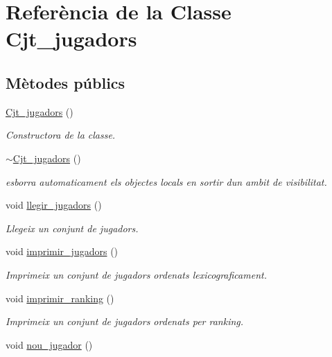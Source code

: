 \hypertarget{class_cjt__jugadors}{}\section{Referència de la Classe Cjt\+\_\+jugadors}
\label{class_cjt__jugadors}
\subsection*{Mètodes públics}
\begin{DoxyCompactItemize}
\item 
\mbox{\hyperlink{class_cjt__jugadors_a473281833edd8838e3517fff07a6b9f1}{Cjt\+\_\+jugadors}} ()
\begin{DoxyCompactList}\small\item\em Constructora de la classe. \end{DoxyCompactList}\item 
\mbox{\hyperlink{class_cjt__jugadors_a49d29aca09d1060d8c3db9771125b85f}{$\sim$\+Cjt\+\_\+jugadors}} ()
\begin{DoxyCompactList}\small\item\em esborra automaticament els objectes locals en sortir d\textquotesingle{}un ambit de visibilitat. \end{DoxyCompactList}\item 
void \mbox{\hyperlink{class_cjt__jugadors_affe03f05c962b8689540de5e1aa97d0a}{llegir\+\_\+jugadors}} ()
\begin{DoxyCompactList}\small\item\em Llegeix un conjunt de jugadors. \end{DoxyCompactList}\item 
void \mbox{\hyperlink{class_cjt__jugadors_a9821d65fda187cb5983d98e4e86fc073}{imprimir\+\_\+jugadors}} ()
\begin{DoxyCompactList}\small\item\em Imprimeix un conjunt de jugadors ordenats lexicograficament. \end{DoxyCompactList}\item 
void \mbox{\hyperlink{class_cjt__jugadors_a63581fdbdfaba9aeb5f0b3b466160902}{imprimir\+\_\+ranking}} ()
\begin{DoxyCompactList}\small\item\em Imprimeix un conjunt de jugadors ordenats per ranking. \end{DoxyCompactList}\item 
void \mbox{\hyperlink{class_cjt__jugadors_abc12f64a28c23ba5bd1e94814476de6e}{nou\+\_\+jugador}} ()

\end{DoxyCompactItemize}
